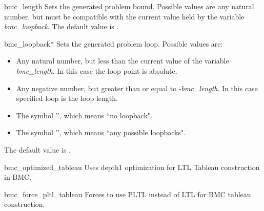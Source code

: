 



\begin{nusmvVar} {bmc\_length}{}{}
Sets the generated problem bound. Possible values are any natural
number, but must be compatible with the current value held by the
variable \emph{bmc\_loopback}. The default value is .
\end{nusmvVar}

\begin{nusmvVar} {bmc\_loopback}{}{*}
Sets the generated problem loop. Possible values are: 

\begin{itemize}
\item Any natural number, but less than the current value of
the variable \emph{bmc\_length}. In this case the loop point is absolute.
\item Any negative number, but greater than or equal to
-\emph{bmc\_length}. In this case specified loop is the loop length. 
\item The symbol '', which means ``no loopback".
\item The symbol '\varvalue{*}', which means ``any possible loopbacks".
\end{itemize}

The default value is \varvalue{*}.
\end{nusmvVar}

\begin{nusmvVar} {bmc\_optimized\_tableau}{}{}
Uses depth1 optimization for LTL Tableau construction in BMC.
\end{nusmvVar}

\begin{nusmvVar} {bmc\_force\_pltl\_tableau}{}{}
Forces to use PLTL instead of LTL for BMC tableau construction.
\end{nusmvVar}

